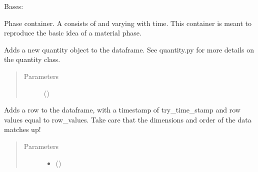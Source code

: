 \documentclass[letterpaper,10pt,openany,oneside,english]{sphinxmanual}
\begin{document}
\begin{fulllineitems}
\label{\detokenize{support_rst/phase:phase.Phase}}
Bases: 

Phase  container. A  consists of  and 
varying with time. This container is meant to reproduce the basic idea of a
material phase.

\begin{fulllineitems}
\label{\detokenize{support_rst/phase:phase.Phase.AddQuantity}}
Adds a new quantity object to the dataframe. See quantity.py for more
details on the quantity class.
\begin{quote}\begin{description}
\item[{Parameters}] \leavevmode
{} () \textendash{} 

\end{description}\end{quote}

\end{fulllineitems}


\begin{fulllineitems}
\label{\detokenize{support_rst/phase:phase.Phase.AddRow}}
Adds a row to the dataframe, with a timestamp of try\_time\_stamp and
row values equal to row\_values. Take care that the dimensions and order
of the data matches up!
\begin{quote}\begin{description}
\item[{Parameters}] \leavevmode\begin{itemize}
\item {} 
 () \textendash{} 


\end{itemize}
\end{description}
\end{quote}
\end{fulllineitems}
\end{fulllineitems}
\end{document}
